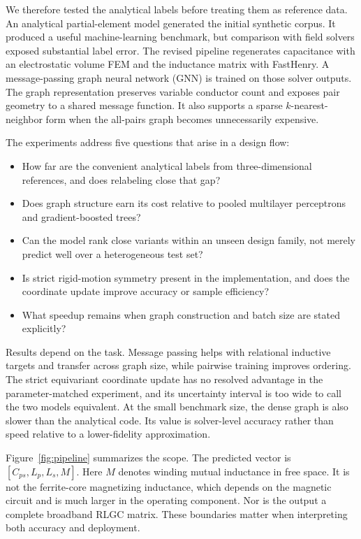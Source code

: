 \documentclass[letterpaper,twocolumn,9pt]{extarticle}
\newcommand{\Cps}{C_{ps}}
\newcommand{\Lp}{L_p}
\newcommand{\Ls}{L_s}
\newcommand{\Mut}{M}
\begin{document}
We therefore tested the analytical labels before treating them as reference data. An analytical partial-element model generated the initial synthetic corpus. It produced a useful machine-learning benchmark, but comparison with field solvers exposed substantial label error. The revised pipeline regenerates capacitance with an electrostatic volume FEM and the inductance matrix with FastHenry. A message-passing graph neural network (GNN) is trained on those solver outputs. The graph representation preserves variable conductor count and exposes pair geometry to a shared message function. It also supports a sparse $k$-nearest-neighbor form when the all-pairs graph becomes unnecessarily expensive.

The experiments address five questions that arise in a design flow:
\begin{itemize}
\item How far are the convenient analytical labels from three-dimensional references, and does relabeling close that gap?
\item Does graph structure earn its cost relative to pooled multilayer perceptrons and gradient-boosted trees?
\item Can the model rank close variants within an unseen design family, not merely predict well over a heterogeneous test set?
\item Is strict rigid-motion symmetry present in the implementation, and does the coordinate update improve accuracy or sample efficiency?
\item What speedup remains when graph construction and batch size are stated explicitly?
\end{itemize}

Results depend on the task. Message passing helps with relational inductive targets and transfer across graph size, while pairwise training improves ordering. The strict equivariant coordinate update has no resolved advantage in the parameter-matched experiment, and its uncertainty interval is too wide to call the two models equivalent. At the small benchmark size, the dense graph is also slower than the analytical code. Its value is solver-level accuracy rather than speed relative to a lower-fidelity approximation.

Figure~\ref{fig:pipeline} summarizes the scope. The predicted vector is $[\Cps,\Lp,\Ls,\Mut]$. Here $\Mut$ denotes winding mutual inductance in free space. It is not the ferrite-core magnetizing inductance, which depends on the magnetic circuit and is much larger in the operating component. Nor is the output a complete broadband RLGC matrix. These boundaries matter when interpreting both accuracy and deployment.
\end{document}
